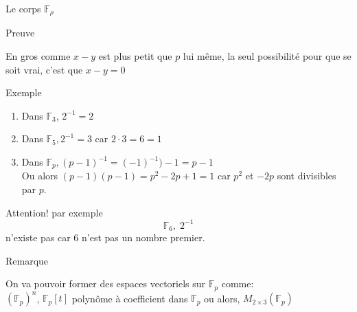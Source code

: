 \begin{parag}{Le corps $\mathbb{F_\rho}$}
\begin{subparag}{Preuve}
\begin{itemize}
    \end{itemize}
    \begin{framedremark}
        En gros comme $x - y$ est plus petit que $p$ lui même, la seul possibilité pour que se soit vrai, c'est que $x - y = 0$
    \end{framedremark}
\end{subparag}
\begin{subparag}{Exemple}
\begin{enumerate}
    \item Dans $\mathbb{F}_3$, $2^{-1} = 2$
    \item Dans $\mathbb{F}_5, 2^{-1} = 3$ car $2\cdot 3 = 6 = 1$
    \item Dans $\mathbb{F}_p, (p-1)^{-1}  = (-1)^{-1} ) -1 = p-1 $
    \\
    Ou alors $(p-1)(p-1) = p^2-2p + 1 = 1$ car $p^2$ et $-2p$ sont divisibles par $p$.
\end{enumerate}
\begin{framedremark}
    Attention! par exemple
    \[\mathbb{F}_6, \; 2^{-1} \]
    n'existe pas car $6$ n'est pas un nombre premier.
\end{framedremark}
\end{subparag}
\begin{subparag}{Remarque}
\begin{framedremark}
    On va pouvoir former des espaces vectoriels sur $\mathbb{F}_p$ comme:
    \\
    $(\mathbb{F}_p)^n$, $\mathbb{F}_p[t]$ polynôme à coefficient dans $\mathbb{F}_p$ ou alors, $M_{2\times 3}(\mathbb{F}_p)$
\end{framedremark}
\end{subparag}
\end{parag}


